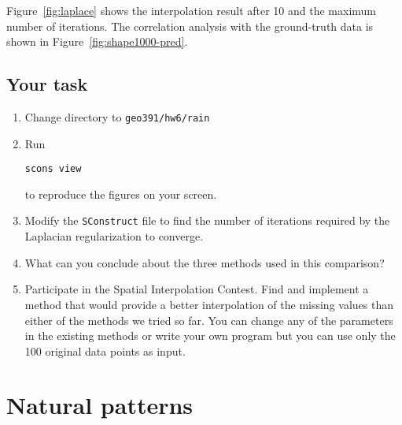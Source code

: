 
Figure~\ref{fig:laplace} shows the interpolation result after 10 and
the maximum number of iterations. The correlation analysis with the
ground-truth data is shown in Figure~\ref{fig:shape1000-pred}.


\subsection{Your task}

\begin{enumerate}
\item Change directory to \verb#geo391/hw6/rain#
\item Run 
\begin{verbatim}
scons view
\end{verbatim}
to reproduce the figures on your screen.
\item Modify the \texttt{SConstruct} file to find the number of iterations required by the Laplacian regularization to converge.
\item What can you conclude about the three methods used in this comparison?
\item Participate in the Spatial Interpolation Contest. Find and
implement a method that would provide a better interpolation of the
missing values than either of the methods we tried so far. You can change any of the parameters in the existing methods or 
write your own program but you can use only the 100 original data points as input.
\end{enumerate}

\lstset{language=python,numbers=left,numberstyle=\tiny,showstringspaces=false}


\section{Natural patterns}

